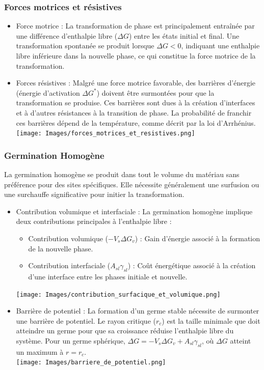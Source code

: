 \documentclass{article}
\begin{document}
        \subsubsection{Forces motrices et résistives}
        \begin{itemize}
            \item Force motrice : La transformation de phase est principalement entraînée par une différence d'enthalpie libre ($\Delta G$) entre les états initial et final. Une transformation spontanée se produit lorsque $\Delta G < 0$, indiquant une enthalpie libre inférieure dans la nouvelle phase, ce qui constitue la force motrice de la transformation.
            \item  Forces résistives : Malgré une force motrice favorable, des barrières d'énergie (énergie d'activation $\Delta G^*$) doivent être surmontées pour que la transformation se produise. Ces barrières sont dues à la création d'interfaces et à d'autres résistances à la transition de phase. La probabilité de franchir ces barrières dépend de la température, comme décrit par la loi d'Arrhénius.
                \texttt{[image: Images/forces\_motrices\_et\_resistives.png]}
        \end{itemize}

        \subsubsection{Germination Homogène}
        La germination homogène se produit dans tout le volume du matériau sans préférence pour des sites spécifiques. Elle nécessite généralement une surfusion ou une surchauffe significative pour initier la transformation.
        \begin{itemize}
            \item Contribution volumique et interfaciale : La germination homogène implique deux contributions principales à l'enthalpie libre :
            \begin{itemize}
                \item Contribution volumique ($-V_s \Delta G_v$) : Gain d'énergie associé à la formation de la nouvelle phase.
                \item Contribution interfaciale ($A_{sl} \gamma_{sl}$) : Coût énergétique associé à la création d'une interface entre les phases initiale et nouvelle. \\
            \end{itemize}
                \texttt{[image: Images/contribution\_surfacique\_et\_volumique.png]}
            \item Barrière de potentiel : La formation d'un germe stable nécessite de surmonter une barrière de potentiel. Le rayon critique ($r_c$) est la taille minimale que doit atteindre un germe pour que sa croissance réduise l'enthalpie libre du système. Pour un germe sphérique, $\Delta G = - V_s \Delta G_v + A_{sl} \gamma_{sl}$, où $\Delta G$ atteint un maximum à $r = r_c$. \\
                \texttt{[image: Images/barriere\_de\_potentiel.png]}
        \end{itemize}
\end{document}
